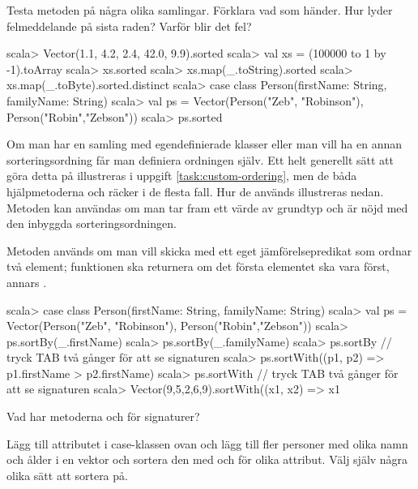 \Subtask Testa metoden  på några olika samlingar. Förklara vad som händer. Hur lyder felmeddelande på sista raden? Varför blir det fel?

\begin{REPL}
scala> Vector(1.1, 4.2, 2.4, 42.0, 9.9).sorted
scala> val xs = (100000 to 1 by -1).toArray
scala> xs.sorted
scala> xs.map(_.toString).sorted
scala> xs.map(_.toByte).sorted.distinct
scala> case class Person(firstName: String, familyName: String)
scala> val ps = Vector(Person("Zeb", "Robinson"), Person("Robin","Zebson")) 
scala> ps.sorted
\end{REPL}	

\Subtask Om man har en samling med egendefinierade klasser eller man vill ha en annan sorteringsordning får man definiera ordningen själv. Ett helt generellt sätt att göra detta på  illustreras i uppgift \ref{task:custom-ordering}, men de båda hjälpmetoderna  och  räcker i de flesta fall. Hur de används illustreras nedan. Metoden  kan användas om man tar fram ett värde av grundtyp och är nöjd med den inbyggda sorteringsordningen. 

Metoden  används om man vill skicka med ett eget jämförelsepredikat som ordnar två element; funktionen ska returnera  om det första elementet ska vara först, annars .

\begin{REPL}
scala> case class Person(firstName: String, familyName: String)
scala> val ps = Vector(Person("Zeb", "Robinson"), Person("Robin","Zebson")) 
scala> ps.sortBy(_.firstName)
scala> ps.sortBy(_.familyName)
scala> ps.sortBy  // tryck TAB två gånger för att se signaturen
scala> ps.sortWith((p1, p2) => p1.firstName > p2.firstName) 
scala> ps.sortWith  // tryck TAB två gånger för att se signaturen
scala> Vector(9,5,2,6,9).sortWith((x1, x2) => x1 %
\end{REPL}
Vad har metoderna  och  för signaturer? 

\Subtask Lägg till attributet  i case-klassen  ovan och lägg till fler personer med olika namn och ålder i en vektor och sortera den med  och  för olika attribut. Välj själv några olika sätt att sortera på. 



